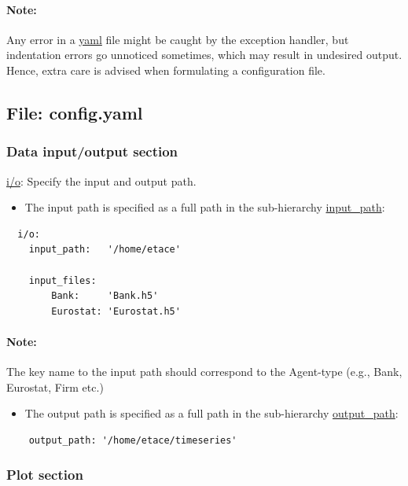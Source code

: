 \documentclass[10pt,a4paper]{article}
\begin{document}
\paragraph{Note:} Any error in a \url{yaml} file might be caught by the exception handler, but indentation errors go unnoticed sometimes, which may result in undesired output. Hence, extra care is advised when formulating a configuration file.

\subsection{File: config.yaml}

\subsubsection*{Data input/output section}

\url{i/o}: Specify the input and output path.

\begin{itemize}
    \item The input path is specified as a full path in the sub-hierarchy \url{input_path}:
\end{itemize}

\lstset{language=C,frame=single, basicstyle=\footnotesize}
\begin{lstlisting}
  i/o:
    input_path:   '/home/etace'

    input_files: 
        Bank:     'Bank.h5' 
        Eurostat: 'Eurostat.h5'
\end{lstlisting}
\paragraph{Note:} The key name to the input path should correspond to the Agent-type (e.g., Bank, Eurostat, Firm etc.)

\begin{itemize}
    \item The output path is specified as a full path in the sub-hierarchy \url{output_path}:
\end{itemize}

\begin{lstlisting}
    output_path: '/home/etace/timeseries'
\end{lstlisting}    


\subsubsection*{Plot section}
\end{document}
